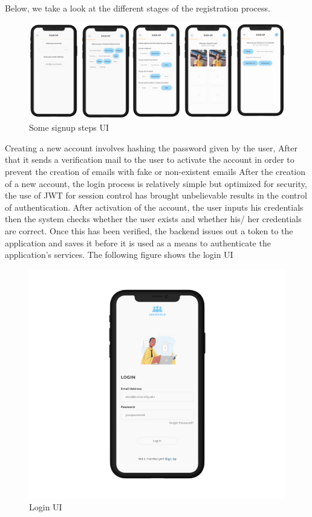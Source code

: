 Below, we take a look at the different stages of the registration process. \\
\begin{figure}[H] 
            \centering
            \includegraphics[scale=0.15]{steps signup.png}
            \caption{Some signup steps UI} 
            \label{fig: Some signup steps UI}
\end{figure}
Creating a new account involves hashing the password given by the user, After that it sends a verification mail to the user to activate the account in order to prevent the creation of emails with fake or non-existent emails After the creation of a new account, the login process is relatively simple but optimized for security, the use of JWT for session control has brought unbelievable results in the control of authentication. After activation of the account,  the user inputs his credentials then the system checks whether the user exists and whether his/ her credentials are correct. Once this has been verified, the backend issues out a token to the application and saves it before it is used as a means to authenticate the application’s services. 
The following figure shows the login UI
\begin{figure}[H] 
            \centering
            \includegraphics[scale=0.2]{login UI.png}
            \caption{Login UI} 
            \label{fig: Login UI}
\end{figure}
